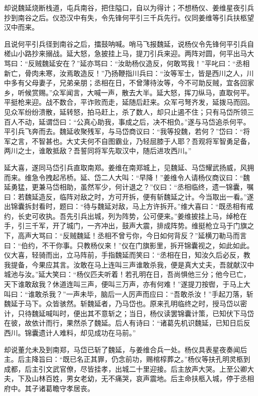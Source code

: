 却说魏延烧断栈道，屯兵南谷，把住隘口，自以为得计；不想杨仪、姜维星夜引兵抄到南谷之后。仪恐汉中有失，令先锋何平引三千兵先行。仪同姜维等引兵扶柩望汉中而来。

且说何平引兵径到南谷之后，擂鼓呐喊。哨马飞报魏延，说杨仪令先锋何平引兵自槎山小路抄来搦战。延大怒，急披挂上马，提刀引兵来迎。两阵对圆，何平出马大骂曰：“反贼魏延安在？”延亦骂曰：“汝助杨仪造反，何敢骂我！”平叱曰：“丞相新亡，骨肉未寒，汝焉敢造反！”乃扬鞭指川兵曰：“汝等军士，皆是西川之人，川中多有父母妻子，兄弟亲朋；丞相在日，不曾薄待汝等，今不可助反贼，宜各回家乡，听候赏赐。”众军闻言，大喊一声，散去大半。延大怒，挥刀纵马，直取何平。平挺枪来迎。战不数合，平诈败而走，延随后赶来。众军弓弩齐发，延拨马而回。见众军纷纷溃散，延转怒，拍马赶上，杀了数人，却只止遏不住；只有马岱所领三百人不动，延谓岱曰：“公真心助我，事成之后，决不相负。”遂与马岱追杀何平。平引兵飞奔而去。魏延收聚残军，与马岱商议曰：“我等投魏，若何？”岱曰：“将军之言，不智甚也。大丈夫何不自图霸业，乃轻屈膝于人耶？吾观将军智勇足备，两川之士，谁敢抵敌？吾誓同将军先取汉中，随后进攻西川。”

延大喜，遂同马岱引兵直取南郑。姜维在南郑城上，见魏延、马岱耀武扬威，风拥而来。维急令拽起吊桥。延、岱二人大叫：“早降！”姜维令人请杨仪商议曰：“魏延勇猛，更兼马岱相助，虽然军少，何计退之？”仪曰：“丞相临终，遗一锦囊，嘱曰：若魏延造反，临阵对敌之时，方可开拆，便有斩魏延之计。今当取出一看。”遂出锦囊拆封看时，题曰：“待与魏延对敌，马上方许拆开。”维大喜曰：“既丞相有戒约，长史可收执。吾先引兵出城，列为阵势，公可便来。”姜维披挂上马，绰枪在手，引三千军，开了城门，一齐冲出，鼓声大震，排成阵势。维挺枪立马于门旗之下，高声大骂曰：“反贼魏延！丞相不曾亏你，今日如何背反？”延横刀勒马而言曰：“伯约，不干你事。只教杨仪来！”仪在门旗影里，拆开锦囊视之，如此如此。仪大喜，轻骑而出，立马阵前，手指魏延而笑曰：“丞相在日，知汝久后必反，教我提备，今果应其言。汝敢在马上连叫三声谁敢杀我，便是真大丈夫，吾就献汉中城池与汝。”延大笑曰：“杨仪匹夫听着！若孔明在日，吾尚惧他三分；他今已亡，天下谁敢敌我？休道连叫三声，便叫三万声，亦有何难！”遂提刀按辔，于马上大叫曰：“谁敢杀我？”一声未毕，脑后一人厉声而应曰：“吾敢杀汝！”手起刀落，斩魏延于马下。众皆骇然。斩魏延者，乃马岱也。原来孔明临终之时，授马岱以密计，只待魏延喊叫时，便出其不意斩之；当日，杨仪读罢锦囊计策，已知伏下马岱在彼，故依计而行，果然杀了魏延。后人有诗曰：“诸葛先机识魏延，已知日后反西川。锦囊遗计人难料，却见成功在马前。”

却说董允未及到南郑，马岱已斩了魏延，与姜维合兵一处。杨仪具表星夜奏闻后主。后主降旨曰：“既已名正其罪，仍念前功，赐棺椁葬之。”杨仪等扶孔明灵柩到成都，后主引文武官僚，尽皆挂孝，出城二十里迎接。后主放声大哭。上至公卿大夫，下及山林百姓，男女老幼，无不痛哭，哀声震地。后主命扶柩入城，停于丞相府中。其子诸葛瞻守孝居丧。

